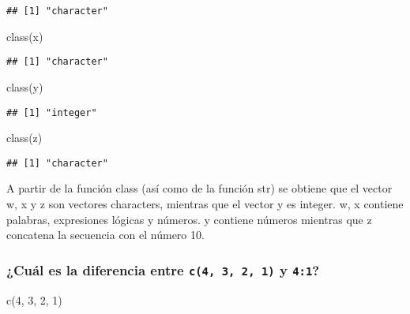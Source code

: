 \documentclass[
]{article}
\newenvironment{Shaded}{\begin{snugshade}}{\end{snugshade}}
\newcommand{\DecValTok}[1]{\textcolor[rgb]{0.00,0.00,0.81}{#1}}
\newcommand{\FunctionTok}[1]{\textcolor[rgb]{0.00,0.00,0.00}{#1}}
\newcommand{\NormalTok}[1]{#1}
\begin{document}
\begin{verbatim}
## [1] "character"
\end{verbatim}

\begin{Shaded}
\begin{Highlighting}[]
\FunctionTok{class}\NormalTok{(x)}
\end{Highlighting}
\end{Shaded}

\begin{verbatim}
## [1] "character"
\end{verbatim}

\begin{Shaded}
\begin{Highlighting}[]
\FunctionTok{class}\NormalTok{(y)}
\end{Highlighting}
\end{Shaded}

\begin{verbatim}
## [1] "integer"
\end{verbatim}

\begin{Shaded}
\begin{Highlighting}[]
\FunctionTok{class}\NormalTok{(z)}
\end{Highlighting}
\end{Shaded}

\begin{verbatim}
## [1] "character"
\end{verbatim}

A partir de la función class (así como de la función str) se obtiene que
el vector w, x y z son vectores characters, mientras que el vector y es
integer. w, x contiene palabras, expresiones lógicas y números. y
contiene números mientras que z concatena la secuencia con el número 10.

\hypertarget{cuuxe1l-es-la-diferencia-entre-c4-3-2-1-y-41}{%
\subsubsection{\texorpdfstring{¿Cuál es la diferencia entre
\texttt{c(4,\ 3,\ 2,\ 1)} y
\texttt{4:1}?}{¿Cuál es la diferencia entre c(4, 3, 2, 1) y 4:1?}}\label{cuuxe1l-es-la-diferencia-entre-c4-3-2-1-y-41}}

\begin{Shaded}
\begin{Highlighting}[]
\FunctionTok{c}\NormalTok{(}\DecValTok{4}\NormalTok{, }\DecValTok{3}\NormalTok{, }\DecValTok{2}\NormalTok{, }\DecValTok{1}\NormalTok{)}
\end{Highlighting}
\end{Shaded}
\end{document}
